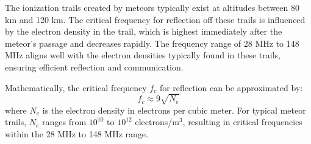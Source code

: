 The ionization trails created by meteors typically exist at altitudes between 80 km and 120 km. The critical frequency for reflection off these trails is influenced by the electron density in the trail, which is highest immediately after the meteor's passage and decreases rapidly. The frequency range of 28 MHz to 148 MHz aligns well with the electron densities typically found in these trails, ensuring efficient reflection and communication.

Mathematically, the critical frequency \( f_c \) for reflection can be approximated by:
\[
f_c \approx 9 \sqrt{N_e}
\]
where \( N_e \) is the electron density in electrons per cubic meter. For typical meteor trails, \( N_e \) ranges from \( 10^{10} \) to \( 10^{12} \) electrons/m\(^3\), resulting in critical frequencies within the 28 MHz to 148 MHz range.

